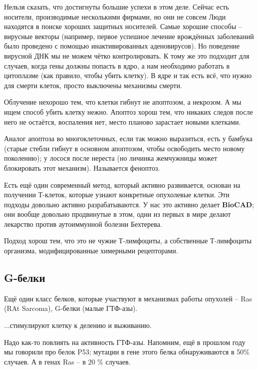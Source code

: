 \documentclass[main.tex]{subfiles}
\begin{document}
\begin{leftbar}
Нельзя сказать, что достигнуты большие успехи в этом деле.
Сейчас есть носители, производимые несколькими фирмами, но они не совсем
Люди находятся в поиске хороших защитных носителей.
Самые хорошие способы -- вирусные векторы (например, первое успешное лечение врождённых заболеваний было проведено с помощью инактивированных аденовирусов).
Но поведение вирусной ДНК мы не можем чётко контролировать.
К тому же это подходит для случаев, когда гены должны попасть в ядро, а нам необходимо работать в цитоплазме (как правило, чтобы убить клетку). В ядре и так есть всё, что нужно для смерти клеток, просто выключены механизмы смерти.
\end{leftbar}

Облучение нехорошо тем, что клетки гибнут не апоптозом, а некрозом.
А мы ищем способ убить клетку нежно.
Апоптоз хорош тем, что никаких следов после него не остаётся, воспаления нет, место планово зарастает новыми клетками.

\begin{leftbar}
Аналог апоптоза во многоклеточных, если так можно выразиться, есть у бамбука (старые стебли гибнут в основном апоптозом, чтобы освободить место новому поколению); у лосося после нереста (но личинка жемчужницы может блокировать этот механизм). Называется феноптоз.
\end{leftbar}

Есть ещё один современный метод, который активно развивается, основан на получении Т-клеток, которые узнают конкретные опухолевые клетки.
Эти подходы довольно активно разрабатываются.
У нас это активно делает \textbf{BioCAD}; они вообще довольно продвинутые в этом, одни из первых в мире делают лекарство против аутоиммунной болезни Бехтерева.

Подход хорош тем, что это не чужие Т-лимфоциты, а собственные Т-лимфоциты организма, модифицированные химерными рецепторами.

\subsection{G-белки}

Ещё один класс белков, которые участвуют в механизмах работы опухолей -- Ras (RAt Sarcoma), G-белки (малые ГТФ-азы).


...стимулируют клетку к делению и выживанию.

Надо как-то повлиять на активность ГТФ-азы.
Напомним, ещё в прошлом году мы говорили про белок P53; мутации в гене этого белка обнаруживаются в 50\% случаев. А в генах Ras -- в 20 \% случаев.
\end{document}
